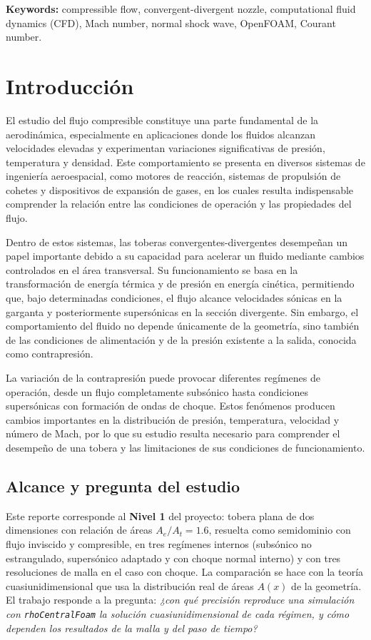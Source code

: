 \documentclass[12pt,letterpaper]{article}
\numberwithin{equation}{section}
\begin{document}
\vspace{0.3cm}
\noindent\textbf{Keywords:} compressible flow, convergent-divergent nozzle, computational fluid dynamics (CFD), Mach number, normal shock wave, OpenFOAM, Courant number.
\newpage
\section{Introducción}
El estudio del flujo compresible constituye una parte fundamental de la aerodinámica, especialmente en aplicaciones donde los fluidos alcanzan velocidades elevadas y experimentan variaciones significativas de presión, temperatura y densidad. Este comportamiento se presenta en diversos sistemas de ingeniería aeroespacial, como motores de reacción, sistemas de propulsión de cohetes y dispositivos de expansión de gases, en los cuales resulta indispensable comprender la relación entre las condiciones de operación y las propiedades del flujo.

Dentro de estos sistemas, las toberas convergentes-divergentes desempeñan un papel importante debido a su capacidad para acelerar un fluido mediante cambios controlados en el área transversal. Su funcionamiento se basa en la transformación de energía térmica y de presión en energía cinética, permitiendo que, bajo determinadas condiciones, el flujo alcance velocidades sónicas en la garganta y posteriormente supersónicas en la sección divergente. Sin embargo, el comportamiento del fluido no depende únicamente de la geometría, sino también de las condiciones de alimentación y de la presión existente a la salida, conocida como contrapresión.

La variación de la contrapresión puede provocar diferentes regímenes de operación, desde un flujo completamente subsónico hasta condiciones supersónicas con formación de ondas de choque. Estos fenómenos producen cambios importantes en la distribución de presión, temperatura, velocidad y número de Mach, por lo que su estudio resulta necesario para comprender el desempeño de una tobera y las limitaciones de sus condiciones de funcionamiento.

\subsection{Alcance y pregunta del estudio}

Este reporte corresponde al \textbf{Nivel 1} del proyecto: tobera plana de dos dimensiones con relación de áreas $A_e/A_t=1.6$, resuelta como semidominio con flujo inviscido y compresible, en tres regímenes internos (subsónico no estrangulado, supersónico adaptado y con choque normal interno) y con tres resoluciones de malla en el caso con choque. La comparación se hace con la teoría cuasiunidimensional que usa la distribución real de áreas $A(x)$ de la geometría. El trabajo responde a la pregunta: \emph{¿con qué precisión reproduce una simulación con \texttt{rhoCentralFoam} la solución cuasiunidimensional de cada régimen, y cómo dependen los resultados de la malla y del paso de tiempo?}
\end{document}
